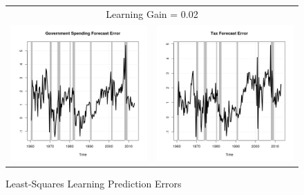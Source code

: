 \documentclass[11pt]{article}
\begin{document}
\begin{figure}\caption{Least-Squares Learning Prediction Errors}\label{fg:fe0.02}
\begin{center}
\begin{tabular}{cc}
\multicolumn{2}{c}{Learning Gain = 0.02} \\ [0.5pc]
\includegraphics[scale=0.45]{./results/pics0.02/fe_gov.png} & \includegraphics[scale=0.45]{./results/pics0.02/fe_tax.png} \\

\end{tabular}
\end{center}
\end{figure}
\end{document}
